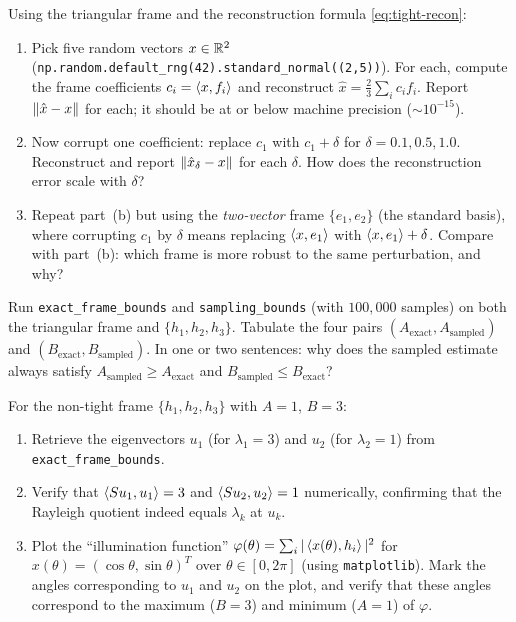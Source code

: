 \begin{exercisebox}[title={Lab Exercise 3.3: Reconstruction Accuracy}]
Using the triangular frame and the reconstruction formula
\eqref{eq:tight-recon}:
\begin{enumerate}[label=(\alph*)]
  \item Pick five random vectors $x\in\mathbb{R}^2$ (\texttt{np.random.default\_rng(42).standard\_normal((2,5))}).
        For each, compute the frame coefficients $c_i=\left\langle x, f_i \right\rangle$
        and reconstruct $\hat x = \tfrac23\sum_i c_i f_i$.
        Report $\left\| \hat x - x \right\|$ for each; it should be at or below
        machine precision ($\sim 10^{-15}$).
  \item Now corrupt one coefficient: replace $c_1$ with $c_1+\delta$
        for $\delta=0.1, 0.5, 1.0$. Reconstruct and report
        $\left\| \hat x_\delta - x \right\|$ for each $\delta$.
        How does the reconstruction error scale with $\delta$?
  \item Repeat part~(b) but using the \emph{two-vector} frame
        $\{e_1, e_2\}$ (the standard basis), where corrupting $c_1$
        by $\delta$ means replacing $\left\langle x, e_1 \right\rangle$ with
        $\left\langle x, e_1 \right\rangle+\delta$. Compare with part~(b): which frame is
        more robust to the same perturbation, and why?
\end{enumerate}
\end{exercisebox}

\begin{exercisebox}[title={Lab Exercise 3.4: Exact vs.\ Sampled Bounds}]
Run \texttt{exact\_frame\_bounds} and \texttt{sampling\_bounds}
(with $100{,}000$ samples) on both the triangular frame and
$\{h_1,h_2,h_3\}$. Tabulate the four pairs $(A_{\text{exact}},
A_{\text{sampled}})$ and $(B_{\text{exact}}, B_{\text{sampled}})$.
In one or two sentences: why does the sampled estimate always satisfy
$A_{\text{sampled}} \ge A_{\text{exact}}$ and
$B_{\text{sampled}} \le B_{\text{exact}}$?
\end{exercisebox}

\begin{exercisebox}[title={Lab Exercise 3.5: Eigenvectors as Extremal Directions}]
For the non-tight frame $\{h_1,h_2,h_3\}$ with $A=1$, $B=3$:
\begin{enumerate}[label=(\alph*)]
  \item Retrieve the eigenvectors $u_1$ (for $\lambda_1=3$) and
        $u_2$ (for $\lambda_2=1$) from \texttt{exact\_frame\_bounds}.
  \item Verify that $\left\langle Su_1, u_1 \right\rangle=3$ and $\left\langle Su_2, u_2 \right\rangle=1$
        numerically, confirming that the Rayleigh quotient indeed equals
        $\lambda_k$ at $u_k$.
  \item Plot the ``illumination function'' $\varphi(\theta)=
        \sum_i|\left\langle x(\theta), h_i \right\rangle|^2$ for
        $x(\theta)=(\cos\theta,\sin\theta)^T$ over $\theta\in[0,2\pi]$
        (using \texttt{matplotlib}). Mark the angles corresponding to
        $u_1$ and $u_2$ on the plot, and verify that these angles
        correspond to the maximum ($B=3$) and minimum ($A=1$) of
        $\varphi$.
\end{enumerate}
\end{exercisebox}

